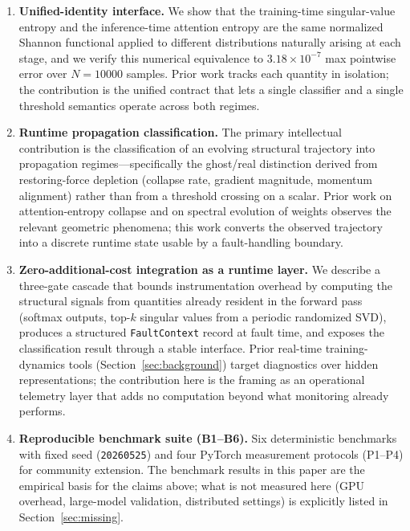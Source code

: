 \documentclass[11pt,a4paper]{article}
\theoremstyle{plain}
\begin{document}
\begin{enumerate}[leftmargin=*]
\item \textbf{Unified-identity interface.}
  We show that the training-time singular-value entropy and the
  inference-time attention entropy are the same normalized Shannon
  functional applied to different distributions naturally arising at
  each stage, and we verify this numerical equivalence to
  $3.18 \times 10^{-7}$ max pointwise error over $N=\num{10000}$
  samples. Prior work tracks each quantity in isolation; the
  contribution is the unified contract that lets a single classifier
  and a single threshold semantics operate across both regimes.

\item \textbf{Runtime propagation classification.}
  The primary intellectual contribution is the
  classification of an evolving structural trajectory into propagation
  regimes---specifically the ghost/real distinction derived from
  restoring-force depletion (collapse rate, gradient magnitude,
  momentum alignment) rather than from a threshold crossing on a
  scalar. Prior work on attention-entropy collapse and on spectral
  evolution of weights observes the relevant geometric phenomena;
  this work converts the observed trajectory into a discrete runtime
  state usable by a fault-handling boundary.

\item \textbf{Zero-additional-cost integration as a runtime layer.}
  We describe a three-gate cascade that bounds instrumentation
  overhead by computing the structural signals from quantities already
  resident in the forward pass (softmax outputs, top-$k$ singular
  values from a periodic randomized SVD), produces a structured
  \texttt{FaultContext} record at fault time, and exposes the
  classification result through a stable interface. Prior real-time
  training-dynamics tools (Section~\ref{sec:background}) target
  diagnostics over hidden representations; the contribution here is
  the framing as an operational telemetry layer that adds no
  computation beyond what monitoring already performs.

\item \textbf{Reproducible benchmark suite (B1--B6).}
  Six deterministic benchmarks with fixed seed (\texttt{20260525})
  and four PyTorch measurement protocols (P1--P4) for community
  extension. The benchmark results in this paper are the empirical
  basis for the claims above; what is not measured here (GPU overhead,
  large-model validation, distributed settings) is explicitly listed
  in Section~\ref{sec:missing}.
\end{enumerate}
\end{document}
